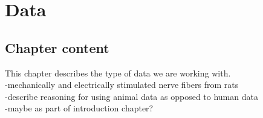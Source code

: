 \chapter{Data}
\section{Chapter content}
This chapter describes the type of data we are working with.\\
-mechanically and electrically stimulated nerve fibers from rats\\
-describe reasoning for using animal data as opposed to human data\\
-maybe as part of introduction chapter?\\

\begin{comment}
Because human nerve data is hard to obtain, we can also use animal data instead as a proxy. Animal data is usable as proxy because we can observe the nerve fibers in vitro but can better separate one single nerve fiber from others. In human data an additional step of fiber separation is necessary to differentiate between individual fibers. We can use the same experimental protocols on Animals as we would on humans. This way we can understand firing patterns of spikes and quantify them. The results can then be applied to human data. \\
In the case of this thesis, we are using the data from wistar rats. The data was recorded from 2011 to 2012 by Roberto de Col and was published in a paper (put reference). The goal of the paper was to evaluate the effects of spiking activity on the response to mechanical stimulation. 

-How much of the exact experimental details are supposed to go here as far as methodology goes, since this is a computer science thesis 

The experiments were done in vitro on peripheral nerve fibers. The fibers were mechanically and electrically stimulated via a custom made electromechanostimulator. The nerve activity was recorded using an electrode. The electrical stimulation consists of small electrical pulses that come in a controlled frequency. The mechanical force is applied in a sinusoidal shape. \\
For single recordings the mechanical force that is applied throughout stays at approximately the same level for most of the files (put for how many files this is the case), but there are exceptions where the mechanical stimulation changes in amplitude and length during one recording. 

The experimental software used for these experiments is called Spike2 and is described further in the background chapter.
\end{comment}
\cleardoublepage
